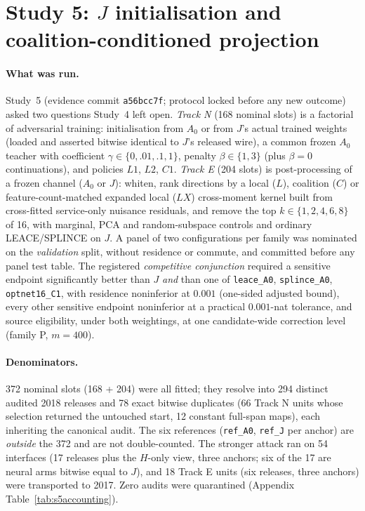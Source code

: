 \documentclass[10pt]{article}
\begin{document}
\section{Study 5: $J$ initialisation and coalition-conditioned projection}
\label{sec:study5}

\paragraph{What was run.} Study~5 (evidence commit \texttt{a56bcc7f}; protocol locked before any new
outcome) asked two questions Study~4 left open. \emph{Track N} (168 nominal slots) is a factorial of
adversarial training: initialisation from $A_0$ or from $J$'s actual trained weights (loaded and asserted
bitwise identical to $J$'s released wire), a common frozen $A_0$ teacher with coefficient
$\gamma\in\{0,.01,.1,1\}$, penalty $\beta\in\{1,3\}$ (plus $\beta=0$ continuations), and policies $L1$,
$L2$, $C1$. \emph{Track E} (204 slots) is post-processing of a frozen channel ($A_0$ or $J$): whiten, rank
directions by a local ($L$), coalition ($C$) or feature-count-matched expanded local ($LX$) cross-moment
kernel built from cross-fitted service-only nuisance residuals, and remove the top $k\in\{1,2,4,6,8\}$ of 16,
with marginal, PCA and random-subspace controls and ordinary LEACE/SPLINCE on $J$. A panel of two
configurations per family was nominated on the \emph{validation} split, without residence or commute, and
committed before any panel test table. The registered \emph{competitive conjunction} required a sensitive
endpoint significantly better than $J$ \emph{and} than one of \texttt{leace\_A0}, \texttt{splince\_A0},
\texttt{optnet16\_C1}, with residence noninferior at $0.001$ (one-sided adjusted bound), every other sensitive
endpoint noninferior at a practical $0.001$-nat tolerance, and source eligibility, under both weightings,
at one candidate-wide correction level (family P, $m=400$).

\paragraph{Denominators.} 372 nominal slots (168 + 204) were all fitted; they resolve into 294 distinct
audited 2018 releases and 78 exact bitwise duplicates (66 Track N units whose selection returned the
untouched start, 12 constant full-span maps), each inheriting the canonical audit. The six references
(\texttt{ref\_A0}, \texttt{ref\_J} per anchor) are \emph{outside} the 372 and are not double-counted. The
stronger attack ran on 54 interfaces (17 releases plus the $H$-only view, three anchors; six of the 17 are
neural arms bitwise equal to $J$), and 18 Track E units (six releases, three anchors) were transported to
2017. Zero audits were quarantined (Appendix Table~\ref{tab:s5accounting}).
\end{document}
